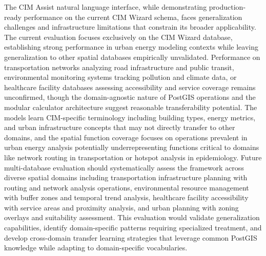 The CIM Assist natural language interface, while demonstrating production-ready performance on the current CIM Wizard schema, faces generalization challenges and infrastructure limitations that constrain its broader applicability. The current evaluation focuses exclusively on the CIM Wizard database, establishing strong performance in urban energy modeling contexts while leaving generalization to other spatial databases empirically unvalidated. Performance on transportation networks analyzing road infrastructure and public transit, environmental monitoring systems tracking pollution and climate data, or healthcare facility databases assessing accessibility and service coverage remains unconfirmed, though the domain-agnostic nature of PostGIS operations and the modular calculator architecture suggest reasonable transferability potential. The models learn CIM-specific terminology including building types, energy metrics, and urban infrastructure concepts that may not directly transfer to other domains, and the spatial function coverage focuses on operations prevalent in urban energy analysis potentially underrepresenting functions critical to domains like network routing in transportation or hotspot analysis in epidemiology. Future multi-database evaluation should systematically assess the framework across diverse spatial domains including transportation infrastructure planning with routing and network analysis operations, environmental resource management with buffer zones and temporal trend analysis, healthcare facility accessibility with service areas and proximity analysis, and urban planning with zoning overlays and suitability assessment. This evaluation would validate generalization capabilities, identify domain-specific patterns requiring specialized treatment, and develop cross-domain transfer learning strategies that leverage common PostGIS knowledge while adapting to domain-specific vocabularies.

